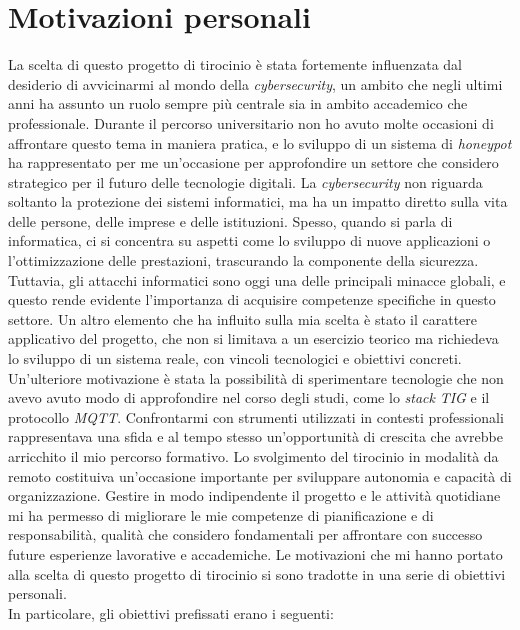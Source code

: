 \section{Motivazioni personali}
La scelta di questo progetto di tirocinio è stata fortemente influenzata dal desiderio di avvicinarmi al mondo della \textit{cybersecurity}, un ambito che negli ultimi anni ha assunto un ruolo sempre più centrale sia in ambito accademico che professionale. Durante il percorso universitario non ho avuto molte occasioni di affrontare questo tema in maniera pratica, e lo sviluppo di un sistema di \textit{honeypot} ha rappresentato per me un'occasione per approfondire un settore che considero strategico per il futuro delle tecnologie digitali.
La \textit{cybersecurity} non riguarda soltanto la protezione dei sistemi informatici, ma ha un impatto diretto sulla vita delle persone, delle imprese e delle istituzioni. Spesso, quando si parla di informatica, ci si concentra su aspetti come lo sviluppo di nuove applicazioni o l'ottimizzazione delle prestazioni, trascurando la componente della sicurezza. Tuttavia, gli attacchi informatici sono oggi una delle principali minacce globali, e questo rende evidente l'importanza di acquisire competenze specifiche in questo settore.  
Un altro elemento che ha influito sulla mia scelta è stato il carattere applicativo del progetto, che non si limitava a un esercizio teorico ma richiedeva lo sviluppo di un sistema reale, con vincoli tecnologici e obiettivi concreti. 
Un'ulteriore motivazione è stata la possibilità di sperimentare tecnologie che non avevo avuto modo di approfondire nel corso degli studi, come lo \textit{stack} \textit{TIG} e il protocollo \textit{MQTT}. Confrontarmi con strumenti utilizzati in contesti professionali rappresentava una sfida e al tempo stesso un'opportunità di crescita che avrebbe arricchito il mio percorso formativo.  
Lo svolgimento del tirocinio in modalità da remoto costituiva un'occasione importante per sviluppare autonomia e capacità di organizzazione. Gestire in modo indipendente il progetto e le attività quotidiane mi ha permesso di migliorare le mie competenze di pianificazione e di responsabilità, qualità che considero fondamentali per affrontare con successo future esperienze lavorative e accademiche.  
Le motivazioni che mi hanno portato alla scelta di questo progetto di tirocinio si sono tradotte in una serie di obiettivi personali.\\
In particolare, gli obiettivi prefissati erano i seguenti:
